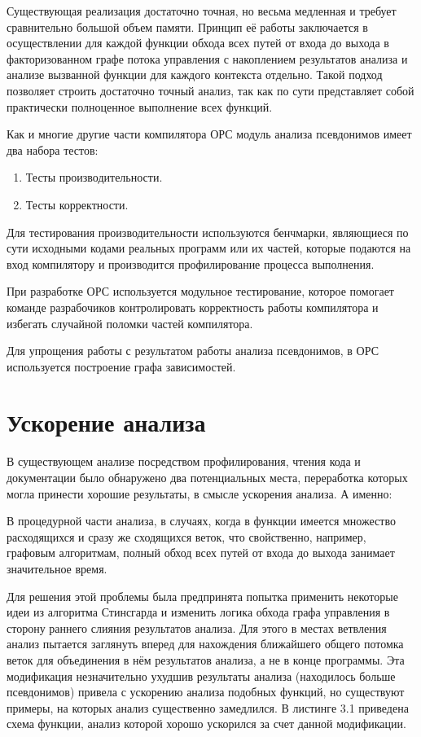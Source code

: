 Существующая реализация достаточно точная, но весьма медленная и требует сравнительно большой объем памяти. Принцип её работы заключается в осуществлении для каждой функции обхода всех путей от входа до выхода в факторизованном графе потока управления с накоплением результатов анализа и анализе вызванной функции для каждого контекста отдельно. Такой подход позволяет строить достаточно точный анализ, так как по сути представляет собой практически полноценное выполнение всех функций.

Как и многие другие части компилятора ОРС модуль анализа псевдонимов имеет два набора тестов:
\begin{enumerate}
    \item Тесты производительности.
    \item Тесты корректности.
\end{enumerate}

Для тестирования производительности используются бенчмарки, являющиеся по сути исходными кодами реальных программ или их частей, которые подаются на вход компилятору и производится профилирование процесса выполнения.

При разработке ОРС используется модульное тестирование, которое помогает команде разрабочиков контролировать корректность работы компилятора и избегать случайной поломки частей компилятора.

Для упрощения работы с результатом работы анализа псевдонимов, в ОРС используется построение графа зависимостей.

\section{Ускорение анализа}

В существующем анализе посредством профилирования, чтения кода и документации было обнаружено два потенциальных места, переработка которых могла принести хорошие результаты, в смысле ускорения анализа. А именно:

В процедурной части анализа, в случаях, когда в функции имеется множество расходящихся и сразу же сходящихся веток, что свойственно, например, графовым алгоритмам, полный обход всех путей от входа до выхода занимает значительное время.

Для решения этой проблемы была предпринята попытка применить некоторые идеи из алгоритма Стинсгарда и изменить логика обхода графа управления в сторону раннего слияния результатов анализа. Для этого в местах ветвления анализ пытается заглянуть вперед для нахождения ближайшего общего потомка веток для объединения в нём результатов анализа, а не в конце программы. Эта модификация незначительно ухудшив результаты анализа (находилось больше псевдонимов) привела с ускорению анализа подобных функций, но существуют примеры, на которых анализ существенно замедлился. В листинге 3.1 приведена схема функции, анализ которой хорошо ускорился за счет данной модификации.

